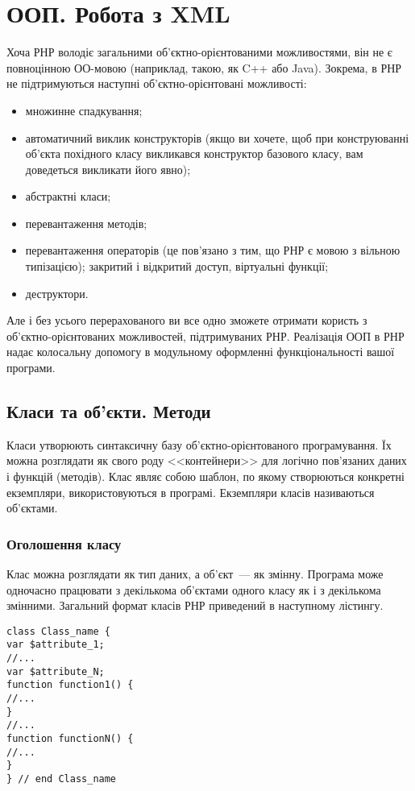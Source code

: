 \chapter{ООП. Робота з XML}
Хоча РНР володіє загальними об'єктно-орієнтованими можливостями, він не є повноцінною ОО-мовою (наприклад, такою, як C++ або Java). Зокрема, в РНР не підтримуються наступні об'єктно-орієнтовані можливості:
\begin{itemize}
\item множинне спадкування;
\item автоматичний виклик конструкторів (якщо ви хочете, щоб при конструюванні об'єкта похідного класу викликався конструктор базового класу, вам доведеться викликати його явно);
\item абстрактні класи;
\item перевантаження методів;
\item перевантаження операторів (це пов'язано з тим, що РНР є мовою з вільною типізацією);
закритий і відкритий доступ, віртуальні функції;
\item деструктори.
\end{itemize}

Але і без усього перерахованого ви все одно зможете отримати користь з об'єктно-орієнтованих можливостей, підтримуваних РНР. Реалізація ООП в РНР надає колосальну допомогу в модульному оформленні функціональності вашої програми.
\section{Класи та об'єкти. Методи}
Класи утворюють синтаксичну базу об'єктно-орієнтованого програмування. Їх можна розглядати як свого роду <<контейнери>> для логічно пов'язаних даних і функцій (методів). Клас являє собою шаблон, по якому створюються конкретні екземпляри, використовуються в програмі. Екземпляри класів називаються об'єктами.

\subsection{Оголошення класу}
Клас можна розглядати як тип даних, а об'єкт~--- як змінну. Програма може одночасно працювати з декількома об'єктами одного класу як і з декількома змінними. Загальний формат класів РНР приведений в наступному лістингу.

\begin{lstlisting}[caption=Синтаксис оголошення класів]
class Class_name {
var $attribute_1;
//...
var $attribute_N;
function function1() {
//...
}
//...
function functionN() {
//...
}
} // end Class_name 
\end{lstlisting}

